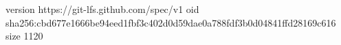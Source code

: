 version https://git-lfs.github.com/spec/v1
oid sha256:cbd677e1666be94eed1fbf3c402d0d59dae0a788fdf3b0d04841ffd28169c616
size 1120
